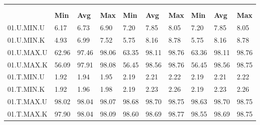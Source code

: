 \begin{tabular}{|>{\raggedright}p{}|>{\raggedright}p{}|>{\raggedright}p{}|>{\raggedright}p{}|>{\raggedright}p{}|>{\raggedright}p{}|>{\raggedright}p{}|>{\raggedright}p{}|>{\raggedright}p{}|>{\raggedright}p{}|}
\hline 
\multirow{3}{0.12\columnwidth}{\textbf{\footnotesize{}Bezeichnung}} & \multicolumn{9}{l|}{\textbf{\footnotesize{}RX-Bitrate {[}MBit/s{]}}}\tabularnewline
\cline{2-10} 
& \multicolumn{3}{l|}{\textbf{\footnotesize{}prp1}} & \multicolumn{3}{l|}{\textbf{\footnotesize{}eth0}} & \multicolumn{3}{l|}{\textbf{\footnotesize{}eth1}}\tabularnewline
\cline{2-10} 
& \textbf{\footnotesize{}Min} & \textbf{\footnotesize{}Avg} & \textbf{\footnotesize{}Max} & \textbf{\footnotesize{}Min} & \textbf{\footnotesize{}Avg} & \textbf{\footnotesize{}Max} & \textbf{\footnotesize{}Min} & \textbf{\footnotesize{}Avg} & \textbf{\footnotesize{}Max}\tabularnewline
\hline 
\hline 
{\footnotesize{}01.U.MIN.U} & {\footnotesize{}6.17} & {\footnotesize{}6.73} & {\footnotesize{}6.90} & {\footnotesize{}7.20} & {\footnotesize{}7.85} & {\footnotesize{}8.05} & {\footnotesize{}7.20} & {\footnotesize{}7.85} & {\footnotesize{}8.05}\tabularnewline
\hline 
\hline 
{\footnotesize{}01.U.MIN.K} & {\footnotesize{}4.93} & {\footnotesize{}6.99} & {\footnotesize{}7.52} & {\footnotesize{}5.75} & {\footnotesize{}8.16} & {\footnotesize{}8.78} & {\footnotesize{}5.75} & {\footnotesize{}8.16} & {\footnotesize{}8.78}\tabularnewline
\hline 
\hline 
{\footnotesize{}01.U.MAX.U} & {\footnotesize{}62.96} & {\footnotesize{}97.46} & {\footnotesize{}98.06} & {\footnotesize{}63.35} & {\footnotesize{}98.11} & {\footnotesize{}98.76} & {\footnotesize{}63.36} & {\footnotesize{}98.11} & {\footnotesize{}98.76}\tabularnewline
\hline 
\hline 
{\footnotesize{}01.U.MAX.K} & {\footnotesize{}56.09} & {\footnotesize{}97.91} & {\footnotesize{}98.08} & {\footnotesize{}56.45} & {\footnotesize{}98.56} & {\footnotesize{}98.76} & {\footnotesize{}56.45} & {\footnotesize{}98.56} & {\footnotesize{}98.75}\tabularnewline
\hline 
\hline 
{\footnotesize{}01.T.MIN.U} & {\footnotesize{}1.92} & {\footnotesize{}1.94} & {\footnotesize{}1.95} & {\footnotesize{}2.19} & {\footnotesize{}2.21} & {\footnotesize{}2.22} & {\footnotesize{}2.19} & {\footnotesize{}2.21} & {\footnotesize{}2.22}\tabularnewline
\hline 
\hline 
{\footnotesize{}01.T.MIN.K} & {\footnotesize{}1.92} & {\footnotesize{}1.96} & {\footnotesize{}1.98} & {\footnotesize{}2.19} & {\footnotesize{}2.23} & {\footnotesize{}2.26} & {\footnotesize{}2.19} & {\footnotesize{}2.23} & {\footnotesize{}2.26}\tabularnewline
\hline 
\hline 
{\footnotesize{}01.T.MAX.U} & {\footnotesize{}98.02} & {\footnotesize{}98.04} & {\footnotesize{}98.07} & {\footnotesize{}98.68} & {\footnotesize{}98.70} & {\footnotesize{}98.75} & {\footnotesize{}98.63} & {\footnotesize{}98.70} & {\footnotesize{}98.75}\tabularnewline
\hline 
\hline 
{\footnotesize{}01.T.MAX.K} & {\footnotesize{}97.90} & {\footnotesize{}98.04} & {\footnotesize{}98.09} & {\footnotesize{}98.60} & {\footnotesize{}98.69} & {\footnotesize{}98.77} & {\footnotesize{}98.55} & {\footnotesize{}98.69} & {\footnotesize{}98.75}\tabularnewline
\hline 
\end{tabular}
\par

